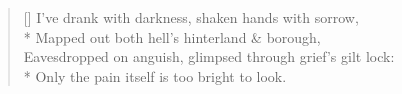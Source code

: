 \settowidth{\versewidth}{Mapped out both hell's hinterland \& borough,}
\begin{verse}[\versewidth]
I've drank with darkness, shaken hands with sorrow,\\*
Mapped out both hell's hinterland \& borough,\\
Eavesdropped on anguish, glimpsed through grief's gilt lock:\\*
Only the pain itself is too bright to look.
\end{verse}
